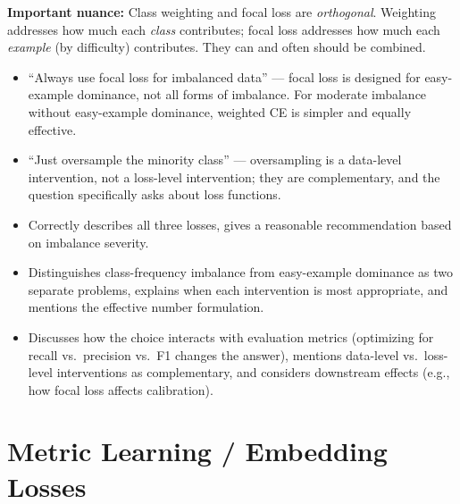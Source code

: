 \begin{interviewq}
\textbf{Important nuance:} Class weighting and focal loss are \textit{orthogonal}. Weighting addresses how much each \textit{class} contributes; focal loss addresses how much each \textit{example} (by difficulty) contributes. They can and often should be combined.

\redflags
\begin{itemize}
    \item ``Always use focal loss for imbalanced data'' --- focal loss is designed for easy-example dominance, not all forms of imbalance. For moderate imbalance without easy-example dominance, weighted CE is simpler and equally effective.
    \item ``Just oversample the minority class'' --- oversampling is a data-level intervention, not a loss-level intervention; they are complementary, and the question specifically asks about loss functions.
\end{itemize}


\goodgreat
\begin{itemize}
    \item {} Correctly describes all three losses, gives a reasonable recommendation based on imbalance severity.
    \item {} Distinguishes class-frequency imbalance from easy-example dominance as two separate problems, explains when each intervention is most appropriate, and mentions the effective number formulation.
    \item {} Discusses how the choice interacts with evaluation metrics (optimizing for recall vs.\ precision vs.\ F1 changes the answer), mentions data-level vs.\ loss-level interventions as complementary, and considers downstream effects (e.g., how focal loss affects calibration).
\end{itemize}

\end{interviewq}

\section{Metric Learning / Embedding Losses}
\label{sec:metric_losses}

